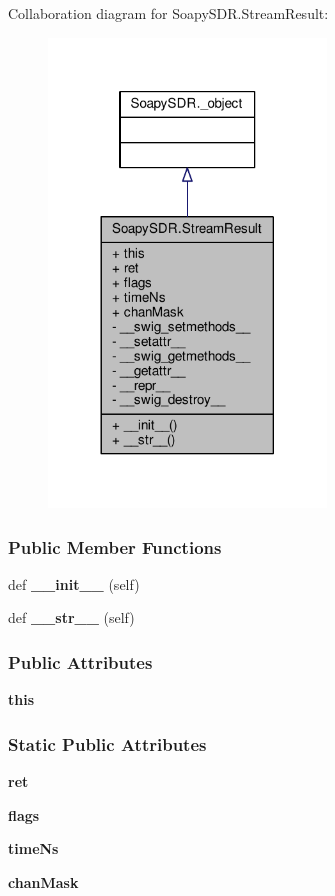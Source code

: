 Collaboration diagram for Soapy\+S\+D\+R.\+Stream\+Result\+:
\nopagebreak
\begin{figure}[H]
\begin{center}
\leavevmode
\includegraphics[width=209pt]{da/de8/classSoapySDR_1_1StreamResult__coll__graph}
\end{center}
\end{figure}
\subsubsection*{Public Member Functions}
\begin{DoxyCompactItemize}
\item 
def {\bf \+\_\+\+\_\+init\+\_\+\+\_\+} (self)
\item 
def {\bf \+\_\+\+\_\+str\+\_\+\+\_\+} (self)
\end{DoxyCompactItemize}
\subsubsection*{Public Attributes}
\begin{DoxyCompactItemize}
\item 
{\bf this}
\end{DoxyCompactItemize}
\subsubsection*{Static Public Attributes}
\begin{DoxyCompactItemize}
\item 
{\bf ret}
\item 
{\bf flags}
\item 
{\bf time\+Ns}
\item 
{\bf chan\+Mask}
\end{DoxyCompactItemize}
